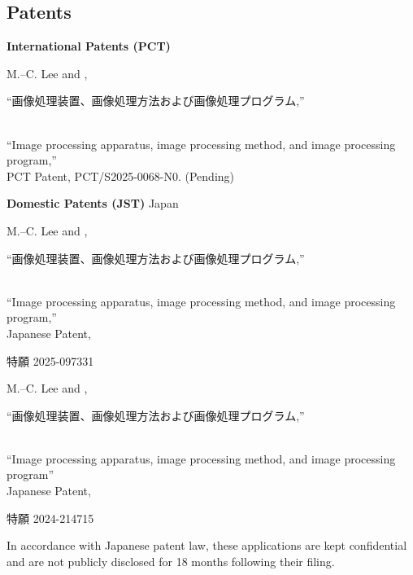 \documentclass[a4paper,9pt]{extarticle}
\begin{document}
\noindent
\subsection*{Patents}
\large{\textbf{International Patents (PCT)}}
\begin{enumerate}[label={[\arabic*]}, start=1]
    \item 
    M.--C. Lee and ,
    \begin{CJK}{UTF8}{min}``画像処理装置、画像処理方法および画像処理プログラム,''\end{CJK} \\
    ``Image processing apparatus, image processing method, and image processing program,'' \\
    PCT Patent, PCT/S2025-0068-N0. (Pending)
\end{enumerate}
\noindent
\textbf{\large{Domestic Patents (JST)}} \hfill Japan
\begin{enumerate}[label={[\arabic*]}, start=1]
    \item 
    M.--C. Lee and ,
    \begin{CJK}{UTF8}{min}``画像処理装置、画像処理方法および画像処理プログラム,''\end{CJK} \\
    ``Image processing apparatus, image processing method, and image processing program,'' \\
    Japanese Patent, \begin{CJK}{UTF8}{min}特願 2025-097331\end{CJK} 
    \item 
    M.--C. Lee and ,
    \begin{CJK}{UTF8}{min}``画像処理装置、画像処理方法および画像処理プログラム,''\end{CJK} \\
    ``Image processing apparatus, image processing method, and image processing program'' \\
    Japanese Patent, \begin{CJK}{UTF8}{min}特願 2024-214715\end{CJK} 
    
    \item[*] In accordance with Japanese patent law, these applications are kept confidential and are not publicly disclosed for 18 months following their filing. \\
 
\end{enumerate} 
\end{document}
